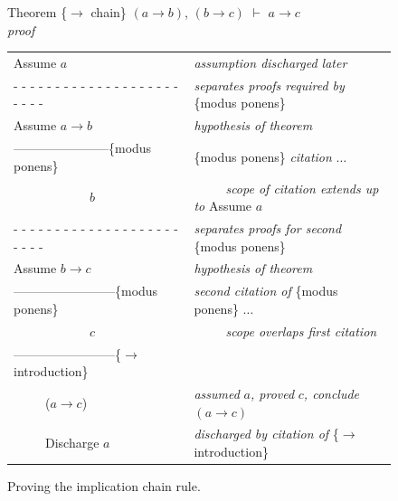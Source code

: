 {\begin{figure}
Theorem \{$\rightarrow$ chain\}
$(a \rightarrow b)$, $(b \rightarrow c)$ $\vdash$ $a \rightarrow c$ \\
\emph{proof}
\begin{center}
\begin{spacing}{0.9}
\begin{tabular}{ll}
Assume $a$                                             &\emph{assumption discharged later}\\
 - - - - - - - - - - - - - - - - - - - - - - - -       &\emph{separates proofs required by} \{modus ponens\}\\
Assume $a \rightarrow b$                               &\emph{hypothesis of theorem}\\
-----------------------\{modus ponens\}                &\{modus ponens\} \emph{citation} $\dots$\\
~~~~~~~~~~~~$b$                                        &~~~~~\emph{scope of citation extends up to} Assume $a$\\
 - - - - - - - - - - - - - - - - - - - - - - - -       &\emph{separates proofs for second} \{modus ponens\} \\
Assume $b \rightarrow c$                               &\emph{hypothesis of theorem}\\
------------------------\{modus ponens\}               &\emph{second citation of} \{modus ponens\} $\dots$\\
~~~~~~~~~~~~$c$                                        &~~~~~\emph{scope overlaps first citation} \\
------------------------\{$\rightarrow$ introduction\} &\\
~~~~~($a \rightarrow c$)                               &\emph{assumed} $a$\emph{, proved} $c$\emph{, conclude} $(a \rightarrow c)$ \\
~~~~~Discharge $a$                                     &\emph{discharged by citation of} \{$\rightarrow$ introduction\}\\
\end{tabular}
\end{spacing}
\end{center}
\caption{Proving the implication chain rule.}
\label{fig:impchain-proof}
\end{figure}

}
